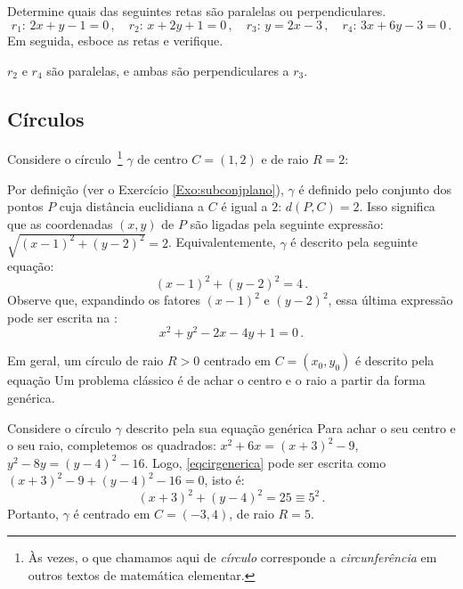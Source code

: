 \begin{exo}
Determine quais das seguintes retas são paralelas ou perpendiculares.
$$r_1:\,2x+y-1=0\,,\quad r_2:\,x+2y+1=0\,,\quad r_3:\,y=2x-3\,,\quad r_4:\,3x+6y-3=0\,.$$
Em seguida, esboce as retas e verifique.
\begin{sol}
$r_2$ e $r_4$ são paralelas, e ambas são perpendiculares a $r_3$.
\end{sol}
\end{exo}

\subsection{Círculos}\label{SecCirculos}

Considere o círculo~\footnote{Às vezes, o que chamamos aqui de \emph{círculo} corresponde
a \emph{circunferência} em outros textos de matemática elementar.} $\gamma$ de centro
$C=(1,2)$ e de raio $R=2$:
\begin{center}
\begin{bmlimage}\end{bmlimage}
\end{center}
 Por definição (ver o Exercício \ref{Exo:subconjplano}), $\gamma$ é definido pelo conjunto
dos pontos $P$ cuja distância euclidiana a $C$ é igual a $2$:
 $d(P,C)=2$. Isso significa que as coordenadas $(x,y)$ de $P$ são ligadas pela seguinte
expressão:
$\sqrt{(x-1)^2+(y-2)^2}=2$. Equivalentemente, $\gamma$ é descrito pela seguinte equação:
$${(x-1)^2+(y-2)^2}=4\,.$$
 Observe que, expandindo os fatores $(x-1)^2$ e $(y-2)^2$, essa última expressão pode ser
escrita na :
$$x^2+y^2-2x-4y+1=0\,.$$

Em geral, um círculo de raio $R>0$ centrado em $C=(x_0,y_0)$ é descrito pela equação
Um problema clássico é de achar o centro e o raio a partir da forma genérica.
\begin{ex}
Considere o círculo $\gamma$ descrito pela sua equação genérica 
Para achar o seu centro e o seu raio, completemos os quadrados: $x^2+6x=(x+3)^2-9$, $y^2-8y=(y-4)^2-16$. Logo, 
\eqref{eqcirgenerica} pode ser escrita como
$(x+3)^2-9+(y-4)^2-16=0$, isto é:
$$(x+3)^2+(y-4)^2=25\equiv 5^2\,.$$
Portanto, $\gamma$ é centrado em $C=(-3,4)$, de raio $R=5$.
\end{ex}

